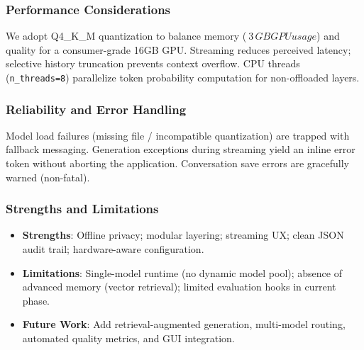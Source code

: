 \documentclass[12pt,a4paper]{article}
\begin{document}
\subsubsection*{Performance Considerations}

We adopt Q4\_K\_M quantization to balance memory (\(~3\,GB GPU usage\)) and quality for a consumer-grade 16GB GPU. Streaming reduces perceived latency; selective history truncation prevents context overflow. CPU threads (\texttt{n\_threads=8}) parallelize token probability computation for non-offloaded layers.

\subsubsection*{Reliability and Error Handling}

Model load failures (missing file / incompatible quantization) are trapped with fallback messaging. Generation exceptions during streaming yield an inline error token without aborting the application. Conversation save errors are gracefully warned (non-fatal).

\subsubsection*{Strengths and Limitations}

\begin{itemize}[leftmargin=1.2em]
    \item \textbf{Strengths}: Offline privacy; modular layering; streaming UX; clean JSON audit trail; hardware-aware configuration.
    \item \textbf{Limitations}: Single-model runtime (no dynamic model pool); absence of advanced memory (vector retrieval); limited evaluation hooks in current phase.
    \item \textbf{Future Work}: Add retrieval-augmented generation, multi-model routing, automated quality metrics, and GUI integration.
\end{itemize}
\end{document}
